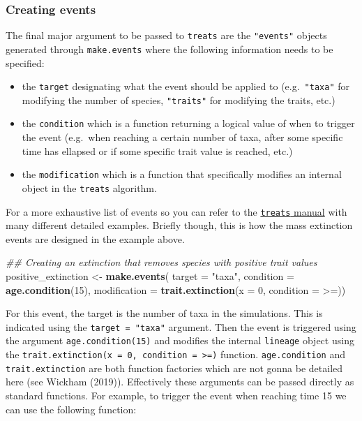 \documentclass[
]{article}
\newenvironment{Shaded}{\begin{snugshade}}{\end{snugshade}}
\newcommand{\CommentTok}[1]{\textcolor[rgb]{0.56,0.35,0.01}{\textit{#1}}}
\newcommand{\DataTypeTok}[1]{\textcolor[rgb]{0.13,0.29,0.53}{#1}}
\newcommand{\DecValTok}[1]{\textcolor[rgb]{0.00,0.00,0.81}{#1}}
\newcommand{\KeywordTok}[1]{\textcolor[rgb]{0.13,0.29,0.53}{\textbf{#1}}}
\newcommand{\NormalTok}[1]{#1}
\newcommand{\StringTok}[1]{\textcolor[rgb]{0.31,0.60,0.02}{#1}}
\providecommand{\tightlist}{%
  \setlength{\itemsep}{0pt}\setlength{\parskip}{0pt}}
\begin{document}
\hypertarget{creating-events}{%
\subsubsection{Creating events}\label{creating-events}}

The final major argument to be passed to \texttt{treats} are the
\texttt{"events"} objects generated through \texttt{make.events} where
the following information needs to be specified:

\begin{itemize}
\tightlist
\item
  the \texttt{target} designating what the event should be applied to
  (e.g.~\texttt{"taxa"} for modifying the number of species,
  \texttt{"traits"} for modifying the traits, etc.)
\item
  the \texttt{condition} which is a function returning a logical value
  of when to trigger the event (e.g.~when reaching a certain number of
  taxa, after some specific time has ellapsed or if some specific trait
  value is reached, etc.)
\item
  the \texttt{modification} which is a function that specifically
  modifies an internal object in the \texttt{treats} algorithm.
\end{itemize}

For a more exhaustive list of events so you can refer to the
\href{http://tguillerme.github.io/treats.html}{\texttt{treats} manual}
with many different detailed examples. Briefly though, this is how the
mass extinction events are designed in the example above.

\begin{Shaded}
\begin{Highlighting}[]
\CommentTok{\#\# Creating an extinction that removes species with positive trait values}
\NormalTok{positive\_extinction \textless{}{-}}\StringTok{ }\KeywordTok{make.events}\NormalTok{(}
    \DataTypeTok{target       =} \StringTok{"taxa"}\NormalTok{,}
    \DataTypeTok{condition    =} \KeywordTok{age.condition}\NormalTok{(}\DecValTok{15}\NormalTok{),}
    \DataTypeTok{modification =} \KeywordTok{trait.extinction}\NormalTok{(}\DataTypeTok{x =} \DecValTok{0}\NormalTok{, }\DataTypeTok{condition =} \StringTok{\textasciigrave{}}\DataTypeTok{\textgreater{}=}\StringTok{\textasciigrave{}}\NormalTok{))}
\end{Highlighting}
\end{Shaded}

For this event, the target is the number of taxa in the simulations.
This is indicated using the \texttt{target\ =\ "taxa"} argument. Then
the event is triggered using the argument \texttt{age.condition(15)} and
modifies the internal \texttt{lineage} object using the
\texttt{trait.extinction(x\ =\ 0,\ condition\ =\ \textasciigrave{}\textgreater{}=\textasciigrave{})}
function. \texttt{age.condition} and \texttt{trait.extinction} are both
function factories which are not gonna be detailed here (see Wickham
(2019)). Effectively these arguments can be passed directly as standard
functions. For example, to trigger the event when reaching time 15 we
can use the following function:
\end{document}
